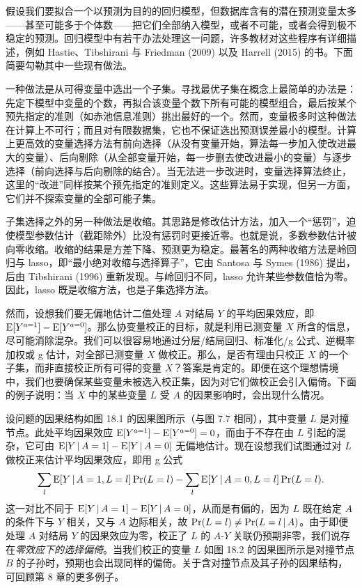 \renewcommand{\FPname}{精要（Fine Point）}
\begin{finepoint}[回归模型的变量选择程序]
假设我们要拟合一个以预测为目的的回归模型，但数据库含有的潜在预测变量太多——甚至可能多于个体数——把它们全部纳入模型，或者不可能，或者会得到极不稳定的预测。回归模型中有若干办法处理这一问题，许多教材对这些程序有详细描述，例如 Hastie、Tibshirani 与 Friedman (2009) 以及 Harrell (2015) 的书。下面简要勾勒其中一些现有做法。

一种做法是从可得变量中选出一个子集。寻找最优子集在概念上最简单的办法是：先定下模型中变量的个数，再拟合该变量个数下所有可能的模型组合，最后按某个预先指定的准则（如赤池信息准则）挑出最好的一个。然而，变量极多时这种做法在计算上不可行；而且对有限数据集，它也不保证选出预测误差最小的模型。计算上更高效的变量选择方法有前向选择（从没有变量开始，算法每一步加入使改进最大的变量）、后向剔除（从全部变量开始，每一步删去使改进最小的变量）与逐步选择（前向选择与后向剔除的结合）。当无法进一步改进时，变量选择算法终止，这里的“改进”同样按某个预先指定的准则定义。这些算法易于实现，但另一方面，它们并不探索变量的全部可能子集。

子集选择之外的另一种做法是收缩。其思路是修改估计方法，加入一个“惩罚”，迫使模型参数估计（截距除外）比没有惩罚时更接近零。也就是说，多数参数估计被向零收缩。收缩的结果是方差下降、预测更为稳定。最著名的两种收缩方法是岭回归与 lasso，即“最小绝对收缩与选择算子”，它由 Santosa 与 Symes (1986) 提出，后由 Tibshirani (1996) 重新发现。与岭回归不同，lasso 允许某些参数值恰为零。因此，lasso 既是收缩方法，也是子集选择方法。
\end{finepoint}
\renewcommand{\FPname}{精要}

然而，设想我们要无偏地估计二值处理 $A$ 对结局 $Y$ 的平均因果效应，即 $\mathrm{E}[Y^{a=1}]-\mathrm{E}[Y^{a=0}]$。那么协变量校正的目标，就是利用已测变量 $X$ 所含的信息，尽可能消除混杂。我们可以很容易地通过分层/结局回归、标准化/g 公式、逆概率加权或 g 估计，对全部已测变量 $X$ 做校正。那么，是否有理由只校正 $X$ 的一个子集，而非直接校正所有可得的变量 $X$？答案是肯定的。即便在这个理想情境中，我们也要确保某些变量未被选入校正集，因为对它们做校正会引入偏倚。下面的例子说明：当 $X$ 中的某些变量 $L$ 受 $A$ 的因果影响时，会出现什么情况。

设问题的因果结构如图 18.1 的因果图所示（与图 7.7 相同），其中变量 $L$ 是对撞节点。此处平均因果效应 $\mathrm{E}[Y^{a=1}]-\mathrm{E}[Y^{a=0}]=0$，而由于不存在由 $L$ 引起的混杂，它可由 $\mathrm{E}[Y\,|\, A=1]-\mathrm{E}[Y\,|\, A=0]$ 无偏地估计。现在设想我们试图通过对 $L$ 做校正来估计平均因果效应，即用 g 公式
\[
\sum_l \mathrm{E}[Y\,|\, A=1,L=l]\Pr(L=l)-\sum_l \mathrm{E}[Y\,|\, A=0,L=l]\Pr(L=l).
\]
这一对比不同于 $\mathrm{E}[Y\,|\, A=1]-\mathrm{E}[Y\,|\, A=0]$，从而是有偏的，因为 $L$ 既在给定 $A$ 的条件下与 $Y$ 相关，又与 $A$ 边际相关，故 $\Pr(L=l)\neq\Pr(L=l\,|\, A)$。由于即便处理 $A$ 对结局 $Y$ 的因果效应为零，校正了 $L$ 的 $A$-$Y$ 关联仍预期非零，我们说存在\emph{零效应下的选择偏倚}。当我们校正的变量 $L$ 如图 18.2 的因果图所示是对撞节点 $B$ 的子孙时，预期也会出现同样的偏倚。关于含对撞节点及其子孙的因果结构，可回顾第 8 章的更多例子。

